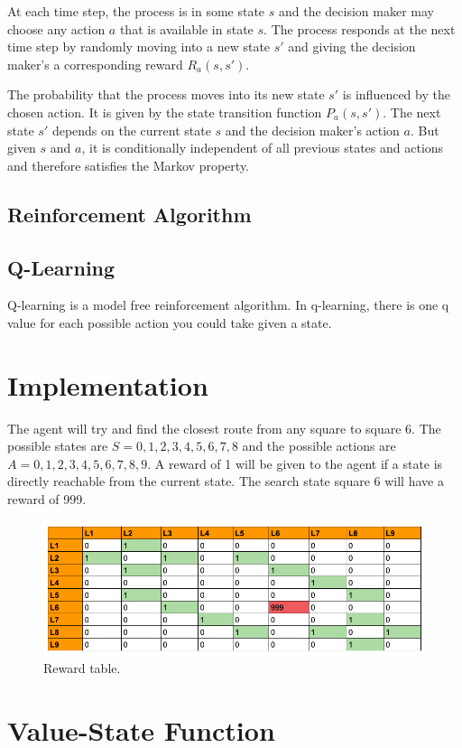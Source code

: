 \documentclass[]{article}
\begin{document}
At each time step, the process is in some state $s$ and the decision maker may choose any action $a$ that is available in state $s$. The process responds at the next time step by randomly moving into a new state $s'$ and giving the decision maker's a corresponding reward $R_a(s, s')$.

The probability that the process moves into its new state $s'$ is influenced by the chosen action. It is given by the state transition function $P_a(s, s')$. The next state $s'$ depends on the current state $s$ and the decision maker's action $a$. But given $s$ and $a$, it is conditionally independent of all previous states and actions and therefore satisfies the Markov property. 

\subsection{Reinforcement Algorithm}

\subsection{Q-Learning}

Q-learning is a model free reinforcement algorithm. In q-learning, there is one q value for each possible action you could take given a state.

\section{Implementation}

The agent will try and find the closest route from any square to square 6. The possible states are $S=0,1,2,3,4,5,6,7,8$ and the possible actions are $A=0,1,2,3,4,5,6,7,8,9$. A reward of 1 will be given to the agent if a state is directly reachable from the current state. The search state square 6 will have a reward of 999.

\begin{figure}[H]
	\includegraphics[scale=0.4]{rewards}
	\centering
	\caption{Reward table.}
\end{figure}

\section{Value-State Function}
\end{document}
